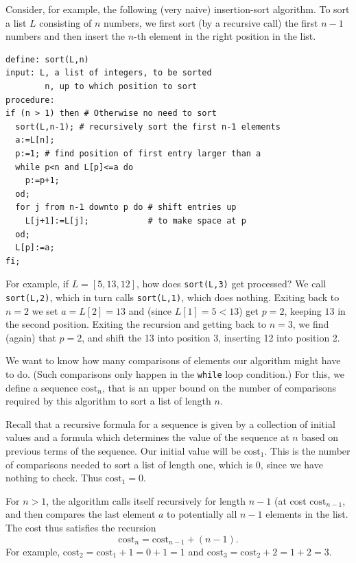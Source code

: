 Consider, for example, the following (very naive) insertion-sort algorithm. 
To sort a list $L$ consisting of $n$ numbers, we first sort (by a recursive
call) the first $n-1$
numbers and then insert the $n$-th element in the right position in the list.
\begin{verbatim}
define: sort(L,n)
input: L, a list of integers, to be sorted
        n, up to which position to sort
procedure:
if (n > 1) then # Otherwise no need to sort
  sort(L,n-1); # recursively sort the first n-1 elements
  a:=L[n];
  p:=1; # find position of first entry larger than a
  while p<n and L[p]<=a do 
    p:=p+1;
  od;
  for j from n-1 downto p do # shift entries up
    L[j+1]:=L[j];            # to make space at p
  od;
  L[p]:=a;
fi;
\end{verbatim}


For example, if $L = [5,13,12]$, how does \verb+sort(L,3)+ get processed? 
We call \verb+sort(L,2)+, which in turn calls
\verb+sort(L,1)+, which does nothing. Exiting back to $n=2$ we set $a=L[2]=13$ and (since
$L[1]=5<13$) get $p=2$, keeping $13$ in the second position.
Exiting the recursion and getting back to $n=3$, we find (again) that $p=2$, and
shift the 13 into position 3, inserting 12 into position 2.
\smallskip

We want to know how many comparisons of elements our algorithm might have to
do. (Such comparisons only happen in the \texttt{while} loop condition.) For
this, we define a sequence $\text{cost}_n$, that is an upper bound on the
number of comparisons required by this algorithm to sort a list of length
$n$.

Recall that a recursive formula for a sequence is given by a collection of initial values
and a formula which determines the value of the sequence at $n$ based on previous
terms of the sequence.
Our initial value will be $\text{cost}_1$. This is the number of comparisons
needed to sort a list of length one, which is 0, since we have nothing to
check. Thus $\text{cost}_1 = 0$.

For $n>1$, the algorithm calls itself recursively for length $n-1$ (at cost
$\text{cost}_{n-1}$, and then compares the last element $a$ to potentially
all $n-1$ elements in the list. The cost thus satisfies the recursion
\[
\text{cost}_n = \text{cost}_{n-1} + (n-1).
\]
For example, $\text{cost}_2 = \text{cost}_1+1=0+1=1$ and $\text{cost}_3 =
\text{cost}_2+2=1+2=3$.

